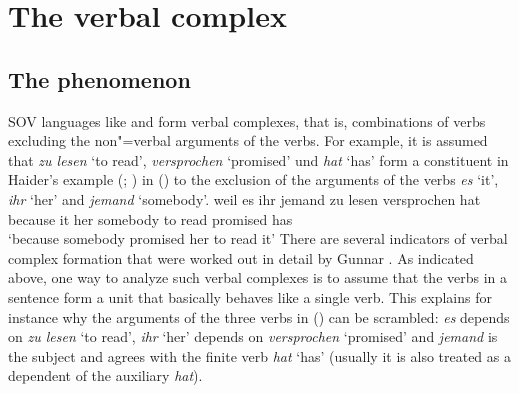 
\chapter{The verbal complex}
\label{chap-verbal-complex}


\section{The phenomenon}

SOV languages like  and  form verbal complexes, that is, combinations of verbs excluding
the non"=verbal arguments of the verbs. For example, it is assumed that \emph{zu lesen} `to read',
\emph{versprochen} `promised' und \emph{hat} `has' form a constituent in Haider's example (\citeyear[]{Haider86c}; \citeyear[]{Haider90b}) in () to the exclusion of the arguments of the verbs
\emph{es} `it', \emph{ihr} `her' and \emph{jemand} `somebody'.
\ea\label{ex-weil-es-ihr-jemand-zu-lesen-versprochen-hat}
\gll weil es ihr jemand zu lesen versprochen hat\\
     because it her somebody to read promised has\\
\glt `because somebody promised her to read it'
\z
There are several indicators of verbal complex formation
that were worked out in detail by Gunnar \citet{Bech55a}. As indicated above, one way to analyze such verbal
complexes is to assume that the verbs in a sentence form a unit that basically behaves like a
single verb. This explains for instance why the arguments of the three verbs in () can be scrambled:
\emph{es} depends on \emph{zu lesen} `to read', \emph{ihr} `her' depends on \emph{versprochen}
`promised' and \emph{jemand} is the subject and agrees with the finite verb \emph{hat} `has'
(usually it is also treated as a dependent of the auxiliary \emph{hat}).

